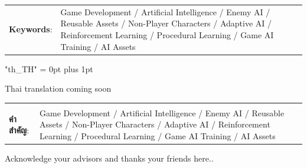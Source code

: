 \documentclass[12pt,oneside,openright,a4paper]{cpe-english-project}
\begin{document}
\begin{flushleft}
\begin{tabular*}{\textwidth}{@{}lp{}}
\textbf{Keywords}: & Game Development / Artificial Intelligence / Enemy AI / Reusable Assets / Non-Player Characters / Adaptive AI / Reinforcement Learning / Procedural Learning / Game AI Training / AI Assets
\end{tabular*}
\end{flushleft}
\endabstract

{
\XeTeXlinebreaklocale "th_TH"	
\XeTeXlinebreakskip = 0pt plus 1pt
\thaifont
\thaiabstract

Thai translation coming soon

\begin{flushleft}
\begin{tabular*}{\textwidth}{@{}lp{}}
 & \\

\textbf{คำสำคัญ}: & Game Development / Artificial Intelligence / Enemy AI / Reusable Assets / Non-Player Characters / Adaptive AI / Reinforcement Learning / Procedural Learning / Game AI Training / AI Assets
\end{tabular*}
\end{flushleft}
\endabstract
}

\preface
Acknowledge your advisors and thanks your friends here..

\tableofcontents                    
\listoftables
\listoffigures                      
\end{document}
